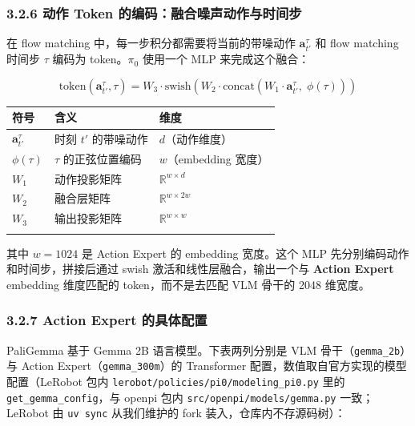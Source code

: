 \documentclass[
  chinese,
]{ctexart}
\begin{document}
\subsubsection{3.2.6 动作 Token
的编码：融合噪声动作与时间步}\label{ux52a8ux4f5c-token-ux7684ux7f16ux7801ux878dux5408ux566aux58f0ux52a8ux4f5cux4e0eux65f6ux95f4ux6b65}

在 flow matching 中，每一步积分都需要将当前的带噪动作
\(\mathbf{a}^\tau_{t'}\) 和 flow matching 时间步 \(\tau\) 编码为
token。\(\pi_0\) 使用一个 MLP 来完成这个融合：

\[
\text{token}(\mathbf{a}^\tau_{t'}, \tau) = W_3 \cdot \text{swish}\!\left(W_2 \cdot \text{concat}\!\left(W_1 \cdot \mathbf{a}^\tau_{t'},\; \phi(\tau)\right)\right)
\]

\begin{center}
\begin{tabular}{@{}>{\raggedright\arraybackslash}p{} >{\raggedright\arraybackslash}p{} >{\raggedright\arraybackslash}p{}@{}}
\toprule\noalign{}
符号 & 含义 & 维度 \\
\midrule\noalign{}
\(\mathbf{a}^\tau_{t'}\) & 时刻 \(t'\) 的带噪动作 & \(d\)（动作维度） \\
\(\phi(\tau)\) & \(\tau\) 的正弦位置编码 & \(w\)（embedding 宽度） \\
\(W_1\) & 动作投影矩阵 & \(\mathbb{R}^{w \times d}\) \\
\(W_2\) & 融合层矩阵 & \(\mathbb{R}^{w \times 2w}\) \\
\(W_3\) & 输出投影矩阵 & \(\mathbb{R}^{w \times w}\) \\
\bottomrule\noalign{}
\end{tabular}
\end{center}

其中 \(w = 1024\) 是 Action Expert 的 embedding 宽度。这个 MLP
先分别编码动作和时间步，拼接后通过 swish 激活和线性层融合，输出一个与
\textbf{Action Expert} embedding 维度匹配的 token，而不是去匹配 VLM
骨干的 2048 维宽度。

\subsubsection{3.2.7 Action Expert
的具体配置}\label{action-expert-ux7684ux5177ux4f53ux914dux7f6e}

PaliGemma 基于 Gemma 2B 语言模型。下表两列分别是 VLM
骨干（\texttt{gemma\_2b}）与 Action Expert（\texttt{gemma\_300m}）的
Transformer 配置，数值取自官方实现的模型配置（LeRobot 包内
\texttt{lerobot/policies/pi0/modeling\_pi0.py} 里的
\texttt{get\_gemma\_config}，与 openpi 包内
\texttt{src/openpi/models/gemma.py} 一致；LeRobot 由 \texttt{uv\ sync}
从我们维护的 fork 装入，仓库内不存源码树）：
\end{document}
